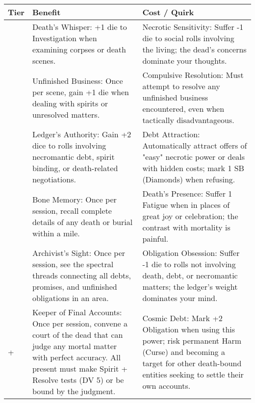 \begin{longtable}{>{\raggedright\arraybackslash}p{1cm} p{5cm} p{5cm}}
\toprule
\textbf{Tier} & \textbf{Benefit} & \textbf{Cost / Quirk} \\
\midrule
1 & Death's Whisper: +1 die to Investigation when examining corpses or death scenes. & Necrotic Sensitivity: Suffer -1 die to social rolls involving the living; the dead's concerns dominate your thoughts. \\
\midrule
2 & Unfinished Business: Once per scene, gain +1 die when dealing with spirits or unresolved matters. & Compulsive Resolution: Must attempt to resolve any unfinished business encountered, even when tactically disadvantageous. \\
\midrule
3 & Ledger's Authority: Gain +2 dice to rolls involving necromantic debt, spirit binding, or death-related negotiations. & Debt Attraction: Automatically attract offers of "easy" necrotic power or deals with hidden costs; mark 1 SB (Diamonds) when refusing. \\
\midrule
4 & Bone Memory: Once per session, recall complete details of any death or burial within a mile. & Death's Presence: Suffer 1 Fatigue when in places of great joy or celebration; the contrast with mortality is painful. \\
\midrule
5 & Archivist's Sight: Once per session, see the spectral threads connecting all debts, promises, and unfinished obligations in an area. & Obligation Obsession: Suffer -1 die to rolls not involving death, debt, or necromantic matters; the ledger's weight dominates your mind. \\
\midrule
6+ & Keeper of Final Accounts: Once per session, convene a court of the dead that can judge any mortal matter with perfect accuracy. All present must make Spirit + Resolve tests (DV 5) or be bound by the judgment. & Cosmic Debt: Mark +2 Obligation when using this power; risk permanent Harm (Curse) and becoming a target for other death-bound entities seeking to settle their own accounts. \\
\bottomrule
\end{longtable}